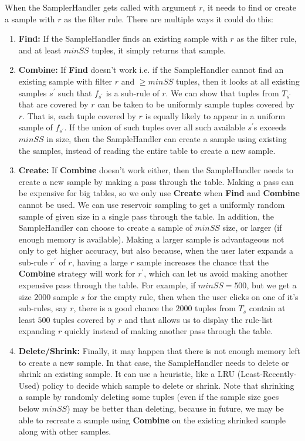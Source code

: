 \documentclass{sig-alternate}
\begin{document}
When the SamplerHandler gets called with argument $r$, it needs to find or create a sample with $r$ as the filter rule. There are multiple ways it could do this:
\begin{enumerate}
\item \textbf{Find:} If the SampleHandler finds an existing sample with $r$ as the filter rule, and at least $minSS$ tuples, it simply returns that sample. 
\item \textbf{Combine:} If \textbf{Find} doesn't work i.e. if the SampleHandler cannot find an existing sample with filter $r$ and $\geq minSS$ tuples, then it looks at all existing samples $s^{\prime}$ such that $f_{s^{\prime}}$ is a sub-rule of $r$. We can show that tuples from $T_{s^{\prime}}$ that are covered by $r$ can be taken to be uniformly sample tuples covered by $r$. That is, each tuple covered by $r$ is equally likely to appear in a uniform sample of $f_{s^{\prime}}$. If the union of such tuples over all such available $s^{\prime}$s exceeds $minSS$ in size, then the SampleHandler can create a sample using existing the samples, instead of reading the entire table to create a new sample.
\item \textbf{Create:} If \textbf{Combine} doesn't work either, then the SampleHandler needs to create a new sample by making a pass through the table. Making a pass can be expensive for big tables, so we only use \textbf{Create} when \textbf{Find} and \textbf{Combine} cannot be used. We can use reservoir sampling to get a uniformly random sample of given size in a single pass through the table. In addition, the SampleHandler can choose to create a sample of $minSS$ size, or larger (if enough memory is available). Making a larger sample is advantageous not only to get higher accuracy, but also because, when the user later expands a sub-rule $r^{\prime}$ of $r$, having a large $r$ sample increases the chance that the \textbf{Combine} strategy will work for $r^{\prime}$, which can let us avoid making another expensive pass through the table. For example, if $minSS = 500$, but we get a size $2000$ sample $s$ for the empty rule, then when the user clicks on one of it's sub-rules, say $r$, there is a good chance the $2000$ tuples from $T_s$ contain at least $500$ tuples covered by $r$ and that allows us to display the rule-list expanding $r$ quickly instead of making another pass through the table. 
\item \textbf{Delete/Shrink:} Finally, it may happen that there is not enough memory left to create a new sample. In that case, the SampleHandler needs to delete or shrink an existing sample. It can use a heuristic, like a LRU (Least-Recently-Used) policy to decide which sample to delete or shrink. Note that shrinking a sample by randomly deleting some tuples (even if the sample size goes below $minSS$) may be better than deleting, because in future, we may be able to recreate a sample using \textbf{Combine} on the existing shrinked sample along with other samples.
\end{enumerate}
\end{document}

